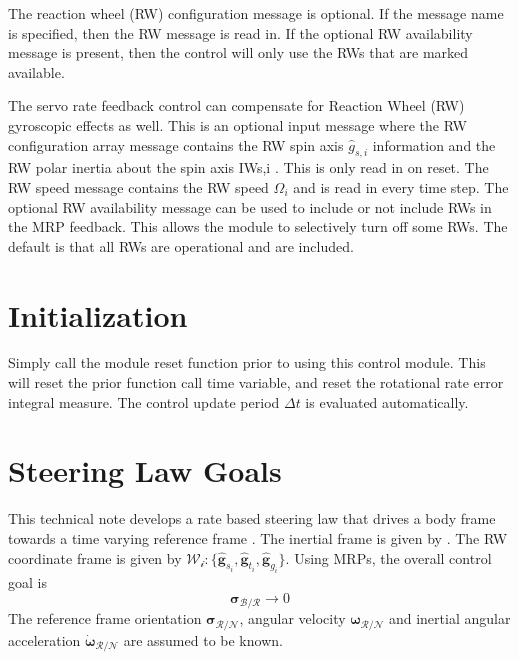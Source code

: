 \documentclass[]{BasiliskReportMemo}
\begin{document}
 The reaction wheel (RW) configuration message is optional.  If the message name is specified, then the RW message is read in.  If the optional RW availability message is present, then the control will only use the RWs that are marked available.  

The servo rate feedback control can compensate for Reaction Wheel (RW) gyroscopic effects as well. This is an optional input message where the RW configuration array message contains the RW spin axis $\hat{g}_{s,i}$ information and the RW polar inertia about the spin axis IWs,i . This is only read in on reset. The RW speed message contains the RW speed $\Omega_i$ and is read in every time step. The optional RW availability message can be used to include or not include RWs in the MRP feedback. This allows the module to selectively turn off some RWs. The default is that all RWs are operational and are included.

\section{Initialization}
Simply call the module reset function prior to using this control module.  This will reset the prior function call time variable, and reset the rotational rate error integral measure.  The control update period $\Delta t$ is evaluated automatically.  


\section{Steering Law Goals}
This technical note develops a rate based steering law that drives a body frame  towards a time varying reference frame . The inertial frame is given by .   The RW coordinate frame is given by $\mathcal{W_{i}}:\{ \hat{\bm g}_{s_{i}}, \hat{\bm g}_{t_{i}}, \hat{\bm g}_{g_{i}} \}$.  Using MRPs, the overall control goal is 
\begin{equation}
	\label{eq:MS:1}
	\bm\sigma_{\mathcal{B}/\mathcal{R}} \rightarrow 0
\end{equation}
The reference frame orientation $\bm \sigma_{\mathcal{R}/\mathcal{N}}$, angular velocity $\bm\omega_{\mathcal{R}/\mathcal{N}}$ and inertial angular acceleration $\dot{\bm \omega}_{\mathcal{R}/\mathcal{N}}$ are assumed to be known. 
\end{document}
